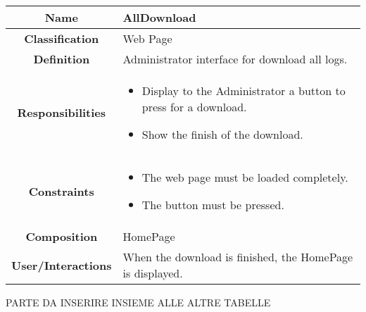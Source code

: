 \documentclass[11pt, a4paper,titlepage]{article}
\begin{document}
\begin{enumerate}
\begin{tabularx}{\textwidth}{| c | X |}
	\hline
	\textbf{Name} & 
	AllDownload
	\\
	\hline
	\textbf{Classification} & 
	Web Page
	\\
	\hline
	\textbf{Definition} & 
	Administrator interface for download all logs.\\
	\hline
	\textbf{Responsibilities} &
	\begin{itemize}
		\item Display to the Administrator a button to press for a download.
		\item Show the finish of the download.
	\end{itemize}
	\\
	\hline
	\textbf{Constraints} & 
	\begin{itemize}
		\item  The web page must be loaded completely.
		\item The button must be pressed.
	\end{itemize}
	\\
	\hline
	\textbf{Composition} & HomePage
	\\
	\hline
	\textbf{User/Interactions} & 
	When the download is finished, the HomePage is displayed.
	\\
	\hline	
\end{tabularx}


PARTE DA INSERIRE INSIEME ALLE ALTRE TABELLE


\end{enumerate}
\end{document}
